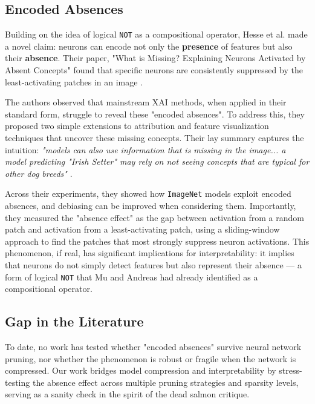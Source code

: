 \subsection{\textbf{Encoded Absences}}

Building on the idea of logical \texttt{NOT} as a compositional operator, Hesse et al. made a novel claim: neurons can encode not only the \textbf{presence} of features but also their \textbf{absence}. Their paper, "What is Missing? Explaining Neurons Activated by Absent Concepts" found that specific neurons are consistently suppressed by the least-activating patches in an image \cite{whatismissing}.

The authors observed that mainstream XAI methods, when applied in their standard form, struggle to reveal these "encoded absences". To address this, they proposed two simple extensions to attribution and feature visualization techniques that uncover these missing concepts.  Their lay summary captures the intuition: \textit{"models can also use information that is missing in the image... a model predicting "Irish Setter" may rely on not seeing concepts that are typical for other dog breeds"} \cite{whatismissing}.

Across their experiments, they showed how \texttt{ImageNet} \cite{imagenet} models exploit encoded absences, and debiasing can be improved when considering them. Importantly, they measured the "absence effect" as the gap between activation from a random patch and activation from a least-activating patch, using a sliding-window approach to find the patches that most strongly suppress neuron activations. This phenomenon, if real, has significant implications for interpretability: it implies that neurons do not simply detect features but also represent their absence — a form of logical \texttt{NOT} that Mu and Andreas \cite{compex} had already identified as a compositional operator.

\subsection{\textbf{Gap in the Literature}}

To date, no work has tested whether "encoded absences" survive neural network pruning, nor whether the phenomenon is robust or fragile when the network is compressed. Our work bridges model compression and interpretability by stress-testing the absence effect across multiple pruning strategies and sparsity levels, serving as a sanity check in the spirit of the dead salmon critique.

